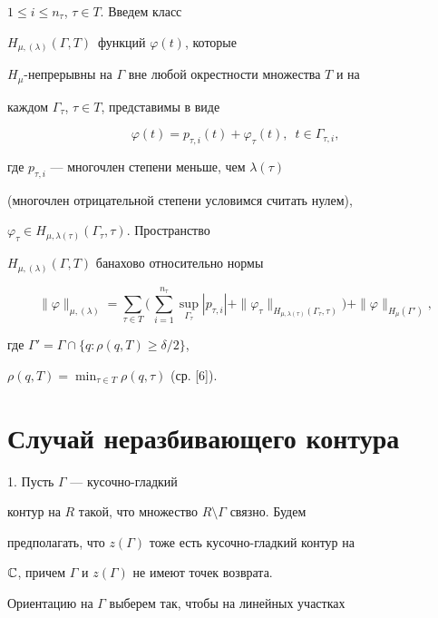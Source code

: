 $1\le i\le n_\tau$, $\tau \in T$. Введем класс


$H_{\mu,(\lambda)}(\Gamma, T)$\ функций $\varphi (t)$, которые


$H_\mu$-непрерывны на $\Gamma$ вне любой окрестности множества $T$ и на


каждом $\Gamma_\tau$, $\tau \in T$, представимы в виде


$$


\varphi (t)=p_{\tau, i}(t)+\varphi_\tau (t), \ \; t \in \Gamma_{\tau, i},


$$


где $p_{\tau, i}$ --- многочлен степени меньше, чем $\lambda(\tau)$


(многочлен отрицательной степени условимся считать нулем),


$\varphi_\tau\in H_{\mu,\lambda(\tau)}(\Gamma_\tau, \tau)$. Пространство


$H_{\mu,(\lambda)}(\Gamma,T)$ банахово относительно нормы


$$


\|\varphi \|_{\mu,(\lambda)}=\sum_{\tau \in T}


\bigg(\,\sum_{i=1}^{n_\tau}\sup_{\Gamma_\tau}|p_{\tau,i}|


+\|\varphi_\tau\|_{H_{\mu,\lambda(\tau)}(\Gamma_\tau,\tau)}\bigg)+


\|\varphi\|_{H_{\mu}(\Gamma')},


$$


где $\Gamma'=\Gamma\cap\{q:\rho (q, T)\ge \delta /2\}$,


$\rho (q,T)=\min_{\tau\in T}\rho (q, \tau)$ (ср. [6]).





\section{Случай неразбивающего контура}





1. Пусть $\Gamma$ --- кусочно-гладкий


контур на $R$ такой, что множество $R\setminus \Gamma$ связно. Будем


предполагать, что $z(\Gamma)$ тоже есть кусочно-гладкий контур на


$\Bbb C$, причем $\Gamma$ и $z(\Gamma)$ не имеют точек возврата.


Ориентацию на $\Gamma$ выберем так, чтобы на линейных участках


